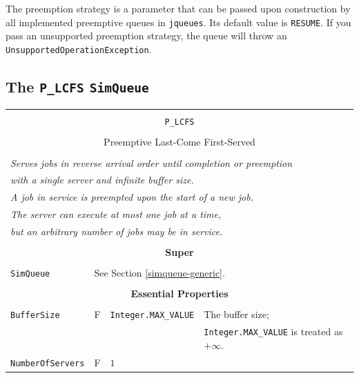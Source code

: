 \documentclass[12pt]{book}
\begin{document}
The preemption strategy is a parameter that can be passed upon construction by all implemented
  preemptive queues in \lstinline|jqueues|.
Its default value is \lstinline|RESUME|.
If you pass an unsupported preemption strategy,
  the queue will throw an \lstinline|UnsupportedOperationException|.

\subsection{The \lstinline{P_LCFS} \lstinline{SimQueue}}
\label{sec:P_LCFS}

\begin{tabular}{|l|l|l|l|}
\hline
\multicolumn{4}{|c|}{} \\
\multicolumn{4}{|c|}{\lstinline[basicstyle=\large]{P_LCFS}} \\
\multicolumn{4}{|c|}{} \\
\multicolumn{4}{|c|}{Preemptive Last-Come First-Served} \\
\multicolumn{4}{|c|}{} \\
\hline
\multicolumn{4}{|l|}{\em Serves jobs in reverse arrival order until completion or preemption} \\
\multicolumn{4}{|l|}{\em with a single server and infinite buffer size.} \\
\multicolumn{4}{|l|}{\em A job in service is preempted upon the start of a new job.} \\
\multicolumn{4}{|l|}{\em The server can execute at most one job at a time,} \\
\multicolumn{4}{|l|}{\em but an arbitrary number of jobs may be in service.} \\
\hline
\multicolumn{4}{|c|}{} \\
\multicolumn{4}{|c|}{\bf Super} \\
\multicolumn{4}{|c|}{} \\
\hline
\lstinline|SimQueue| & \multicolumn{3}{|l|}{See Section \ref{simqueue-generic}.} \\
\hline
\multicolumn{4}{|c|}{} \\
\multicolumn{4}{|c|}{\bf Essential Properties} \\
\multicolumn{4}{|c|}{} \\
\hline
\lstinline|BufferSize|      & F & \lstinline|Integer.MAX_VALUE|
                            & The buffer size; \\
                        & & & \lstinline|Integer.MAX_VALUE| is treated as $+\infty$. \\
\hline
\lstinline|NumberOfServers|    & F & $1$

\end{tabular}
\end{document}

